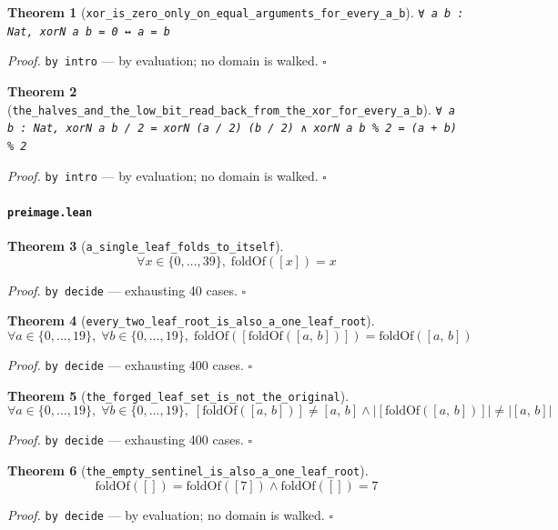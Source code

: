 \documentclass[11pt]{article}
\newtheorem{theorem}{Theorem}[section]
\begin{document}
\begin{theorem}[\texttt{xor\_is\_zero\_only\_on\_equal\_arguments\_for\_every\_a\_b}]
\texttt{∀ a b : Nat, xorN a b = 0 ↔ a = b}
\end{theorem}
\noindent\emph{Proof.} \texttt{by
  intro} --- by evaluation; no domain is walked. \hfill$\square$

\begin{theorem}[\texttt{the\_halves\_and\_the\_low\_bit\_read\_back\_from\_the\_xor\_for\_every\_a\_b}]
\texttt{∀ a b : Nat, xorN a b / 2 = xorN (a / 2) (b / 2) ∧ xorN a b \% 2 = (a + b) \% 2}
\end{theorem}
\noindent\emph{Proof.} \texttt{by
  intro} --- by evaluation; no domain is walked. \hfill$\square$

\paragraph{\texttt{preimage.lean}}

\begin{theorem}[\texttt{a\_single\_leaf\_folds\_to\_itself}]
\[ \forall x \in \{0,\dots,39\},\; \mathrm{foldOf}\mathopen{}\left([x]\right) = x \]
\end{theorem}
\noindent\emph{Proof.} \texttt{by decide} --- exhausting 40 cases. \hfill$\square$

\begin{theorem}[\texttt{every\_two\_leaf\_root\_is\_also\_a\_one\_leaf\_root}]
\[ \forall a \in \{0,\dots,19\},\; \forall b \in \{0,\dots,19\},\; \mathrm{foldOf}\mathopen{}\left([\mathrm{foldOf}\mathopen{}\left([a,\,b]\right)]\right) = \mathrm{foldOf}\mathopen{}\left([a,\,b]\right) \]
\end{theorem}
\noindent\emph{Proof.} \texttt{by decide} --- exhausting 400 cases. \hfill$\square$

\begin{theorem}[\texttt{the\_forged\_leaf\_set\_is\_not\_the\_original}]
\[ \forall a \in \{0,\dots,19\},\; \forall b \in \{0,\dots,19\},\; [\mathrm{foldOf}\mathopen{}\left([a,\,b]\right)] \neq [a,\,b] \land \left|[\mathrm{foldOf}\mathopen{}\left([a,\,b]\right)]\right| \neq \left|[a,\,b]\right| \]
\end{theorem}
\noindent\emph{Proof.} \texttt{by decide} --- exhausting 400 cases. \hfill$\square$

\begin{theorem}[\texttt{the\_empty\_sentinel\_is\_also\_a\_one\_leaf\_root}]
\[ \mathrm{foldOf}\mathopen{}\left([]\right) = \mathrm{foldOf}\mathopen{}\left([7]\right) \land \mathrm{foldOf}\mathopen{}\left([]\right) = 7 \]
\end{theorem}
\noindent\emph{Proof.} \texttt{by decide} --- by evaluation; no domain is walked. \hfill$\square$
\end{document}
